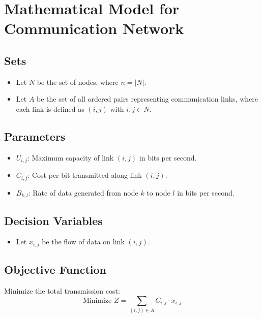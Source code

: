 \documentclass{article}
\begin{document}
\section*{Mathematical Model for Communication Network}

\subsection*{Sets}
\begin{itemize}
    \item Let \( N \) be the set of nodes, where \( n = |N| \).
    \item Let \( A \) be the set of all ordered pairs representing communication links, where each link is defined as \( (i, j) \) with \( i, j \in N \).
\end{itemize}

\subsection*{Parameters}
\begin{itemize}
    \item \( U_{i,j} \): Maximum capacity of link \( (i,j) \) in bits per second.
    \item \( C_{i,j} \): Cost per bit transmitted along link \( (i,j) \).
    \item \( B_{k,l} \): Rate of data generated from node \( k \) to node \( l \) in bits per second.
\end{itemize}

\subsection*{Decision Variables}
\begin{itemize}
    \item Let \( x_{i,j} \) be the flow of data on link \( (i,j) \).
\end{itemize}

\subsection*{Objective Function}
Minimize the total transmission cost:
\[
\text{Minimize } Z = \sum_{(i,j) \in A} C_{i,j} \cdot x_{i,j}
\]
\end{document}
